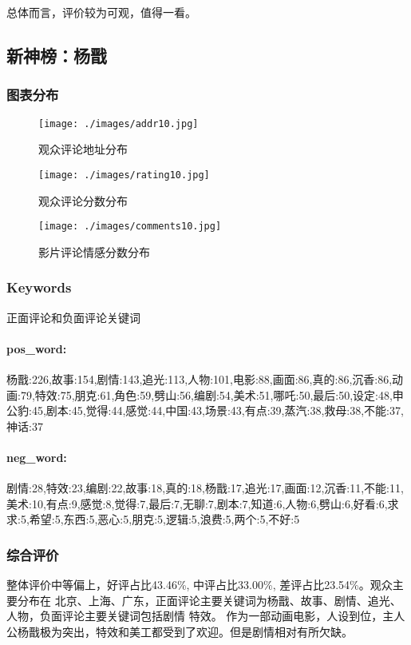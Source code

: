 \documentclass[12pt]{article}
\begin{document}
总体而言，评价较为可观，值得一看。


\subsection*{新神榜：杨戬}
\subsubsection*{图表分布}
\begin{figure}[H]
    \centering
    \begin{minipage}[t]{0.48\textwidth}
    \centering
    \texttt{[image: ./images/addr10.jpg]}
    \caption{观众评论地址分布}
    \end{minipage}
    \begin{minipage}[t]{0.48\textwidth}
    \centering
    \texttt{[image: ./images/rating10.jpg]}
    \caption{观众评论分数分布}
    \end{minipage}
\end{figure}
\begin{figure}[H]
    \centering
    \texttt{[image: ./images/comments10.jpg]}
    \caption{影片评论情感分数分布} 
\end{figure} 
\subsubsection*{Keywords}
正面评论和负面评论关键词
\paragraph*{pos\_word:}
杨戬:226,故事:154,剧情:143,追光:113,人物:101,电影:88,画面:86,真的:86,沉香:86,动画:79,特效:75,朋克:61,角色:59,劈山:56,编剧:54,美术:51,哪吒:50,最后:50,设定:48,申公豹:45,剧本:45,觉得:44,感觉:44,中国:43,场景:43,有点:39,蒸汽:38,救母:38,不能:37,神话:37
\paragraph*{neg\_word:}
剧情:28,特效:23,编剧:22,故事:18,真的:18,杨戬:17,追光:17,画面:12,沉香:11,不能:11,美术:10,有点:9,感觉:8,觉得:7,最后:7,无聊:7,剧本:7,知道:6,人物:6,劈山:6,好看:6,求求:5,希望:5,东西:5,恶心:5,朋克:5,逻辑:5,浪费:5,两个:5,不好:5
\subsubsection*{综合评价}
整体评价中等偏上，好评占比43.46\%, 中评占比33.00\%, 差评占比23.54\%。观众主要分布在
北京、上海、广东，正面评论主要关键词为杨戬、故事、剧情、追光、人物，负面评论主要关键词包括剧情
特效。
作为一部动画电影，人设到位，主人公杨戬极为突出，特效和美工都受到了欢迎。但是剧情相对有所欠缺。
\end{document}
